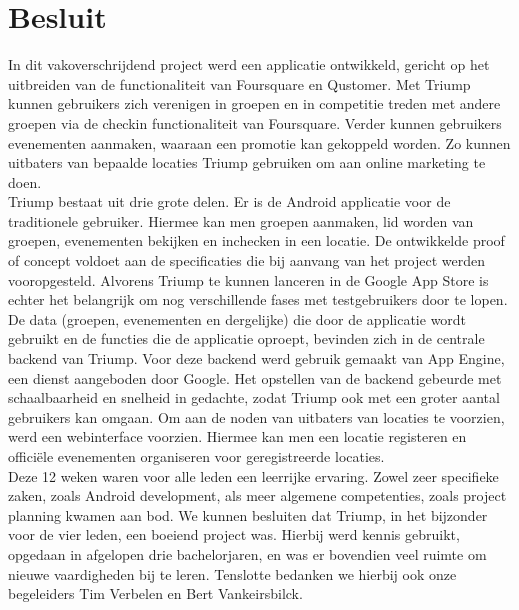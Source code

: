 
\chapter{Besluit}%

In dit vakoverschrijdend project werd een applicatie ontwikkeld, gericht op het uitbreiden van de functionaliteit van Foursquare en Qustomer.
Met Triump kunnen gebruikers zich verenigen in groepen en in competitie treden met andere groepen via de checkin functionaliteit van Foursquare.
Verder kunnen gebruikers evenementen aanmaken, waaraan een promotie kan gekoppeld worden. Zo kunnen uitbaters van bepaalde locaties Triump gebruiken om aan online marketing te doen.\\


Triump bestaat uit drie grote delen.
Er is de Android applicatie voor de traditionele gebruiker. Hiermee kan men groepen aanmaken, lid worden van groepen, evenementen bekijken en inchecken in een locatie.
De ontwikkelde proof of concept voldoet aan de specificaties die bij aanvang van het project werden vooropgesteld. Alvorens Triump te kunnen lanceren in de Google App Store is echter het belangrijk om nog verschillende fases met testgebruikers door te lopen.
De data (groepen, evenementen en dergelijke) die door de applicatie wordt gebruikt en de functies die de applicatie oproept, bevinden zich in de centrale backend van Triump.
Voor deze backend werd gebruik gemaakt van App Engine, een dienst aangeboden door Google.
Het opstellen van de backend gebeurde met schaalbaarheid en snelheid in gedachte, zodat Triump ook met een groter aantal gebruikers kan omgaan.
Om aan de noden van uitbaters van locaties te voorzien, werd een webinterface voorzien. 
Hiermee kan men een locatie registeren en officiële evenementen organiseren voor geregistreerde locaties.\\


Deze 12 weken waren voor alle leden een leerrijke ervaring. Zowel zeer specifieke zaken, zoals Android development, als meer algemene competenties, zoals project planning kwamen aan bod.
We kunnen besluiten dat Triump, in het bijzonder voor de vier leden, een boeiend project was. Hierbij werd kennis gebruikt, opgedaan in afgelopen drie bachelorjaren, en was er bovendien veel ruimte om nieuwe vaardigheden bij te leren.
Tenslotte bedanken we hierbij ook onze begeleiders Tim Verbelen en Bert Vankeirsbilck.